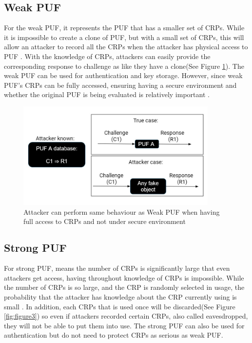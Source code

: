\subsection{Weak PUF}
For the weak PUF, it represents the PUF that has a smaller set of CRPs. While it is impossible to 
create a clone of PUF, but with a small set of CRPs, this will allow an attacker to record all the CRPs when the attacker has physical access to PUF \cite{Reference1}. With the knowledge of CRPs, attackers can easily provide the corresponding
response to challenge as like they have a clone(See Figure \ref{fig:figure2}). The weak PUF can be used for authentication and key storage. However, since weak PUF's CRPs can be fully accessed, ensuring having a secure environment and whether the original PUF is being evaluated is relatively important \cite{Reference1}.
\begin{figure}[htp]
    \centering
    \includegraphics[width=10cm]{figures/figure2.jpg}
    \caption{Attacker can perform same behaviour as Weak PUF when having full access to CRPs and not under secure environment}
    \label{fig:figure2}
    \end{figure}


\subsection{Strong PUF}
For strong PUF, means the number of CRPs is significantly large that even attackers get access, having throughout knowledge of CRPs is impossible. While the number of CRPs is so large,
and the CRP is randomly selected in usage, the probability that the attacker has knowledge about the CRP currently using is small \cite{Reference1}. In addition, each CRPs that is used once will 
be discarded(See Figure \ref{fig:figure3}) so even if attackers recorded certain CRPs, also called eavesdropped, they will not be able to put them into use. The strong PUF can also be used for authentication but do not need to protect CRPs
as serious as weak PUF.

